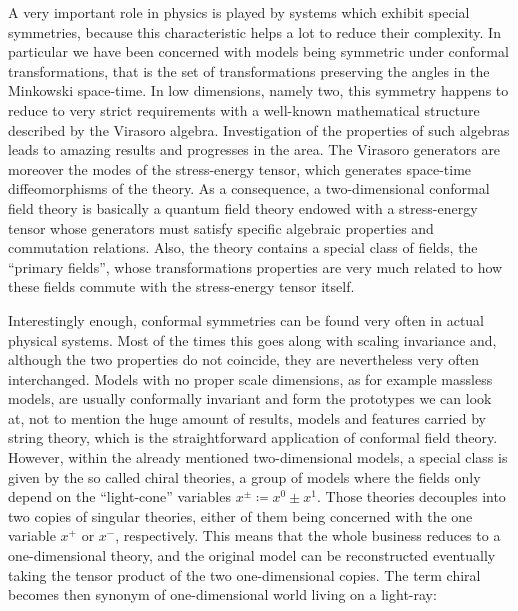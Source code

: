  \bigskip 
 A very important role in physics is played by systems 
 which exhibit special symmetries, because this characteristic
 helps a lot to reduce their complexity. In particular 
 we have been concerned with models being symmetric under
 conformal transformations, that is the set of transformations 
 preserving the angles in the Minkowski space-time.   
 In low dimensions, namely two, this symmetry happens to reduce to
 very strict requirements with a well-known mathematical structure
 described by the Virasoro algebra. Investigation of the 
 properties of such algebras leads to amazing results
 and progresses in the area. The Virasoro generators are 
 moreover the modes of the stress-energy tensor, which 
 generates space-time diffeomorphisms of the theory. 
 As a consequence, a two-dimensional conformal field
 theory is basically a quantum field theory endowed with
 a stress-energy tensor whose generators must satisfy 
 specific algebraic properties and commutation relations.
 Also, the theory contains a special class of fields,
 the ``primary fields'', whose transformations properties 
 are very much related to how these fields commute with the 
 stress-energy tensor itself.
 
 Interestingly enough, conformal symmetries can be found
 very often in actual physical systems. Most of the 
 times this goes along with scaling invariance and,
 although the two properties do not coincide, they 
 are nevertheless very often interchanged. Models 
 with no proper scale dimensions, as for example
 massless models, are usually conformally invariant 
 and form the prototypes we can look at, not to mention 
 the huge amount of results, models and features carried
 by string theory, which is the straightforward 
 application of conformal field theory. However, within 
 the already mentioned two-dimensional models, 
 a special class is given
 by the so called chiral theories, a group of models
 where the fields only depend on the ``light-cone'' variables
 $x^{\pm}\coloneqq x^0\pm x^1$.
 Those theories decouples into two copies of 
 singular theories, either of them being concerned with 
 the one variable $x^+$ or $x^-$, respectively. This 
 means that the whole business reduces to a one-dimensional 
 theory, and the original model can be reconstructed eventually
 taking the tensor product of the two one-dimensional copies. 
 The term chiral becomes then synonym of one-dimensional 
 world living on a light-ray:
 \begin{figure}[htbp]
 \centering 
 \end{figure}
 
